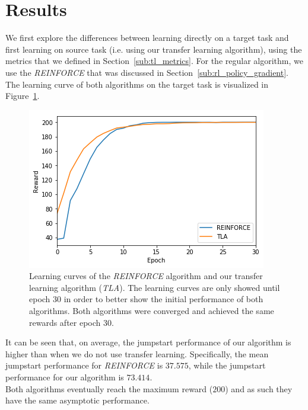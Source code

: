 \section{Results}
We first explore the differences between learning directly on a target task and first learning on source task (i.e. using our transfer learning algorithm), using the metrics that we defined in Section~\ref{sub:tl_metrics}. For the regular algorithm, we use the \textit{REINFORCE} that was discussed in Section~\ref{sub:rl_policy_gradient}. The learning curve of both algorithms on the target task is visualized in Figure~\ref{fig:tla_re_5envs}.
\begin{figure}[H]
    \centering
    \includegraphics[width=.8\linewidth]{images/tla_re_target_5envs.png}
    \caption[Learning curves for \textit{REINFORCE} and \textit{TLA}]{Learning curves of the \textit{REINFORCE} algorithm and our transfer learning algorithm (\textit{TLA}). The learning curves are only showed until epoch 30 in order to better show the initial performance of both algorithms. Both algorithms were converged and achieved the same rewards after epoch 30.}
    \label{fig:tla_re_5envs}
\end{figure}
It can be seen that, on average, the jumpstart performance of our algorithm is higher than when we do not use transfer learning.
Specifically, the mean jumpstart performance for \textit{REINFORCE} is $37.575$, while the jumpstart performance for our algorithm is $73.414$.\\
Both algorithms eventually reach the maximum reward ($200$) and as such they have the same asymptotic performance.\\

